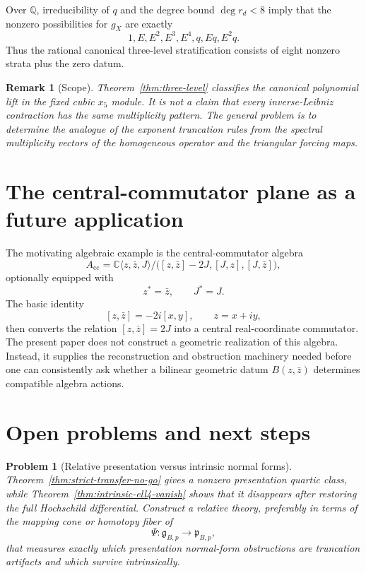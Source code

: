 \documentclass[11pt]{amsart}
\newtheorem{remark}[theorem]{Remark}
\newtheorem{problem}[theorem]{Problem}
\newcommand{\C}{\mathbb C}
\newcommand{\Q}{\mathbb Q}
\newcommand{\gpres}{\mathfrak p}
\newcommand{\ghoch}{\mathfrak g}
\begin{document}
Over $\Q$, irreducibility of $q$ and the degree bound $\deg r_d<8$ imply that the nonzero possibilities for $g_X$ are exactly
\[
1,
E,
E^2,
E^3,
E^4,
q,
Eq,
E^2q.
\]
Thus the rational canonical three-level stratification consists of eight nonzero strata plus the zero datum.

\begin{remark}[Scope]\label{rem:strat-scope}
Theorem~\ref{thm:three-level} classifies the canonical polynomial lift in the fixed cubic $x_5$ module.  It is not a claim that every inverse-Leibniz contraction has the same multiplicity pattern.  The general problem is to determine the analogue of the exponent truncation rules from the spectral multiplicity vectors of the homogeneous operator and the triangular forcing maps.
\end{remark}

\section{The central-commutator plane as a future application}

The motivating algebraic example is the central-commutator algebra
\[
A_{\mathrm{cc}}
=
\C\langle z,\bar z,J\rangle
\Big/
\bigl([z,\bar z]-2J,[J,z],[J,\bar z]\bigr),
\]
optionally equipped with
\[
z^*=\bar z,
\qquad
J^*=J.
\]
The basic identity
\[
[z,\bar z]=-2i[x,y],
\qquad
z=x+iy,
\]
then converts the relation $[z,\bar z]=2J$ into a central real-coordinate commutator.  The present paper does not construct a geometric realization of this algebra.  Instead, it supplies the reconstruction and obstruction machinery needed before one can consistently ask whether a bilinear geometric datum $B(z,\bar z)$ determines compatible algebra actions.

\section{Open problems and next steps}

\begin{problem}[Relative presentation versus intrinsic normal forms]
Theorem~\ref{thm:strict-transfer-no-go} gives a nonzero presentation quartic class, while Theorem~\ref{thm:intrinsic-ell4-vanish} shows that it disappears after restoring the full Hochschild differential.  Construct a relative theory, preferably in terms of the mapping cone or homotopy fiber of
\[
\Psi:\ghoch_{B,p}\to\gpres_{B,p},
\]
that measures exactly which presentation normal-form obstructions are truncation artifacts and which survive intrinsically.
\end{problem}
\end{document}
